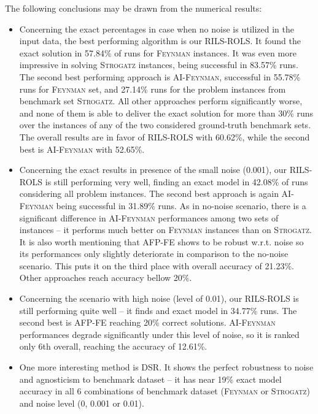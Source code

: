 \documentclass{bmcart}
\begin{document}
The following conclusions may be drawn from the numerical results: 

\begin{itemize}
	\item Concerning the exact percentages in case when no noise is utilized in the input data, the best performing algorithm is our \textsc{RILS-ROLS}. It found the exact solution in 57.84\% of runs for \textsc{Feynman} instances. It was even more impressive in solving \textsc{Strogatz} instances, being successful in 83.57\% runs. The second best performing  approach is \textsc{AI-Feynman}, successful in 55.78\% runs for \textsc{Feynman} set, and 27.14\% runs for the problem instances from benchmark set \textsc{Strogatz}. All other approaches perform significantly worse, and none of them is able to deliver the exact solution for more than 30\% runs over the instances of any of the two considered ground-truth benchmark sets. The overall results are in favor of \textsc{RILS-ROLS} with 60.62\%, while the second best is \textsc{AI-Feynman} with 52.65\%. 
	\item  Concerning the exact results in presence of the small noise (0.001), our \textsc{RILS-ROLS} is still performing very well, finding an exact model in 42.08\% of runs considering all problem instances. The second best approach is again \textsc{AI-Feynman} being successful in 31.89\% runs. As in no-noise scenario, there is a significant difference in \textsc{AI-Feynman} performances among two sets of instances -- it performs much better on \textsc{Feynman} instances than on \textsc{Strogatz}. It is also worth mentioning that \textsc{AFP-FE} shows to be robust w.r.t. noise so its performances only slightly deteriorate in comparison to the no-noise scenario. This puts it on the third place with overall accuracy of 21.23\%. Other approaches reach accuracy bellow 20\%.  
	\item  Concerning the scenario with high noise (level of 0.01), our \textsc{RILS-ROLS} is still performing quite well -- it finds and exact model in 34.77\% runs. The second best is \textsc{AFP-FE} reaching 20\% correct solutions. \textsc{AI-Feynman} performances degrade significantly under this level of noise, so it is ranked only 6th overall, reaching the accuracy of 12.61\%. 
	
	\item One more interesting method is \textsc{DSR}. It shows the perfect robustness to noise and agnosticism to benchmark dataset -- it has near 19\% exact model accuracy in all 6 combinations of benchmark dataset (\textsc{Feynman} or \textsc{Strogatz}) and noise level (0, 0.001 or 0.01).     
	

\end{itemize}
\end{document}
